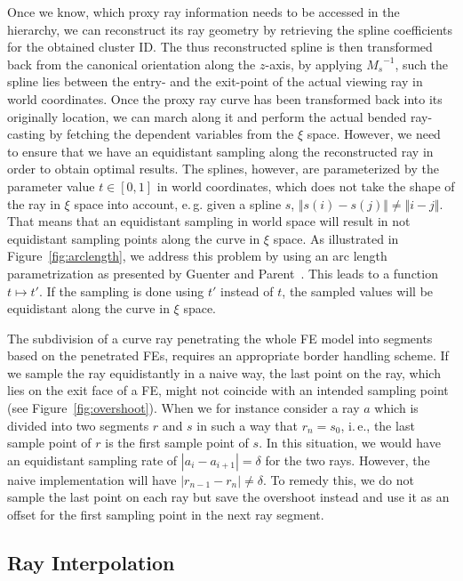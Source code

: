 \documentclass[review,journal]{vgtc}         %
\begin{document}
Once we know, which proxy ray information needs to be accessed in the hierarchy, we can reconstruct its ray geometry by retrieving the spline coefficients for the obtained cluster ID. The thus reconstructed spline is then transformed back from the canonical orientation along the $z$-axis, by applying ${M_s}^{-1}$, such the spline lies between the entry- and the exit-point of the actual viewing ray in world coordinates. Once the proxy ray curve has been transformed back into its originally location, we can march along it and perform the actual bended ray-casting by fetching the dependent variables from the $\xi$ space. However, we need to ensure that we have an equidistant sampling along the reconstructed ray in order to obtain optimal results. The splines, however, are parameterized by the parameter value $t \in [0,1]$ in world coordinates, which does not take the shape of the ray in $\xi$ space into account, e.\,g. given a spline $s$, $\Vert s(i) - s(j) \Vert \neq \Vert i - j \Vert$. That means that an equidistant sampling in world space will result in not equidistant sampling points along the curve in $\xi$ space. As illustrated in Figure~\ref{fig:arclength}, we address this problem by using an arc length parametrization as presented by Guenter and Parent~\cite{guenter90arclength}. This leads to a function $t \mapsto t'$. If the sampling is done using $t'$ instead of $t$, the sampled values will be equidistant along the curve in $\xi$ space.

The subdivision of a curve ray penetrating the whole FE model into segments based on the penetrated FEs, requires an appropriate border handling scheme. If we sample the ray equidistantly in a naive way, the last point on the ray, which lies on the exit face of a FE, might not coincide with an intended sampling point (see Figure~\ref{fig:overshoot}). When we for instance consider a ray $a$ which is divided into two segments $r$ and $s$ in such a way that $r_n = s_0$, i.\,e., the last sample point of $r$ is the first sample point of $s$. In this situation, we would have an equidistant sampling rate of $\left|a_i - a_{i+1}\right| = \delta$ for the two rays. However, the naive implementation will have $\left|r_{n-1} - r_{n}\right| \neq \delta$. To remedy this, we do not sample the last point on each ray but save the overshoot instead and use it as an offset for the first sampling point in the next ray segment.

\subsection{Ray Interpolation}
\end{document}
